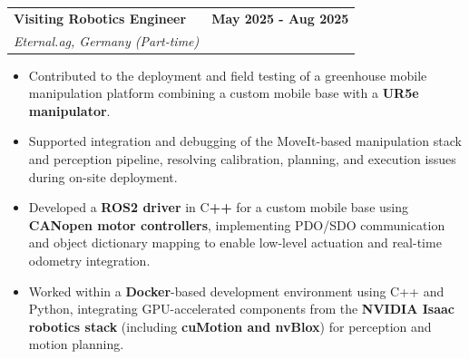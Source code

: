 \documentclass[a4paper,20pt]{article}
\makeatletter
\newcommand{\resumeSubheading}[4]{
  \vspace{-1pt}\item
    \begin{tabular*}{0.97\textwidth}{l@{\extracolsep{\fill}}r}
      \textbf{#1} \small \textit{#4} & #2 \\
      \textit{#3} &  \\
    \end{tabular*}\vspace{-5pt}
}
\newcommand{\resumeSubheading}[5]{ %
  \vspace{-1pt}\item
    \begin{tabular*}{0.97\textwidth}{l@{\extracolsep{\fill}}r}
      \textbf{#1} & #2 \\
      \textit{#3} & \textit{#4} \\
    \end{tabular*} 
    \vspace{-2pt}
    \small #5 %
    \vspace{-5pt}
}
\makeatother
\begin{document}
\vspace{5pt}
\resumeSubheading
{Visiting Robotics Engineer}{\textbf{May 2025 - Aug 2025}}
{Eternal.ag, Germany (Part-time)}{}
\begin{itemize}
\vspace{2}

\item Contributed to the deployment and field testing of a greenhouse mobile manipulation platform combining a custom mobile base with a\textbf{ UR5e manipulator}. \vspace{-2pt}

\item Supported integration and debugging of the MoveIt-based manipulation stack and perception pipeline, resolving calibration, planning, and execution issues during on-site deployment. \vspace{-2pt}

\item Developed a \textbf{ROS2 driver} in C\textbf{++} for a custom mobile base using \textbf{CANopen motor controllers}, implementing PDO/SDO communication and object dictionary mapping to enable low-level actuation and real-time odometry integration. \vspace{-2pt}

\item Worked within a \textbf{Docker}-based development environment using C++ and Python, integrating GPU-accelerated components from the \textbf{NVIDIA Isaac robotics stack} (including \textbf{cuMotion and nvBlox}) for perception and motion planning. \vspace{-2pt}

\end{itemize}
\end{document}
